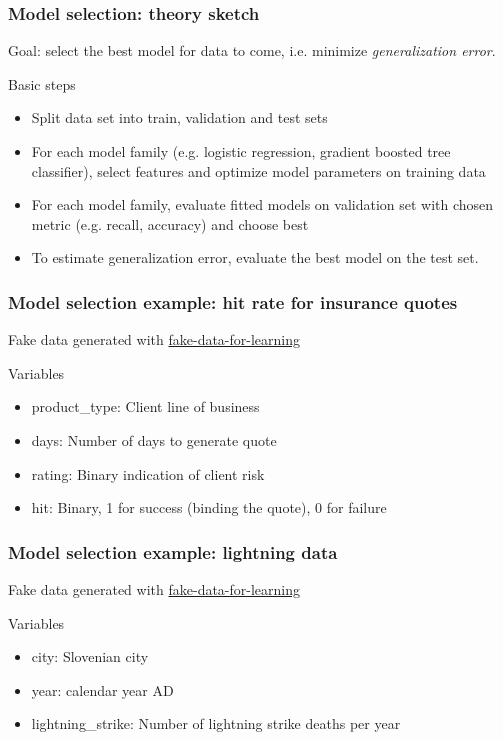 \begin{frame}
  \frametitle{Model selection: theory sketch}
  Goal: select the best model for data to come, i.e. minimize \emph{generalization error}.\newline

  Basic steps
  \begin{itemize}
    \item {\color{blue}Split data} set into train, validation and test sets
    \item For each model family (e.g. logistic regression, gradient boosted tree classifier), {\color{blue}select features} and {\color{blue}optimize model parameters} on training data
    \item For each model family, {\color{blue}evaluate fitted models} on validation set with chosen metric (e.g. recall, accuracy) and choose best
    \item To {\color{blue}estimate generalization error}, evaluate the best model on the test set.
  \end{itemize}
\end{frame}

\begin{frame}
\frametitle{Model selection example: hit rate for insurance quotes}
Fake data generated with \href{https://munichpavel.github.io/fake-data-for-learning/}{fake-data-for-learning}\newline

 \newline

 Variables
\begin{itemize}
\item product\_type: Client line of business
\item days: Number of days to generate quote
\item rating: Binary indication of client risk
\item hit: Binary, 1 for success (binding the quote), 0 for failure
\end{itemize}
\end{frame}


\begin{frame}
\frametitle{Model selection example: lightning data}
Fake data generated with \href{https://munichpavel.github.io/fake-data-for-learning/}{fake-data-for-learning}\newline

 \newline

 Variables
\begin{itemize}
\item city: Slovenian city
\item year: calendar year AD
\item lightning\_strike: Number of lightning strike deaths per year
\end{itemize}
\end{frame}

